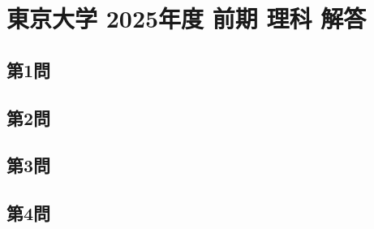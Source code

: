 ﻿\documentclass[../../uem_mat_tok_a.tex]{subfiles}
\begin{document}
    \section{東京大学 2025年度 前期 理科 解答}

    \subsection{第1問}
    

    \clearpage

    \subsection{第2問}
    

    \clearpage

    \subsection{第3問}
    

    \clearpage

    \subsection{第4問}
    
\end{document}
